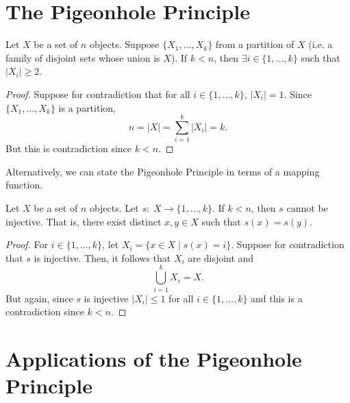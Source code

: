 



\section{The Pigeonhole Principle}

\begin{theorem}
    Let $X$ be a set of $n$ objects. Suppose $\{X_1,\ldots,X_k\}$ from a partition of $X$ (i.e. a family of disjoint sets whose union is $X$). If $k < n$, then $\exists i \in \{1,\ldots,k\}$ such that $|X_i| \geq 2$.
\end{theorem}

\begin{proof}
    Suppose for contradiction that for all $i \in \{1,\ldots,k\}$, $|X_i| = 1$. Since $\{X_1,\ldots,X_k\}$ is a partition, 
    $$
    n = |X| = \sum_{i=1}^k |X_i| = k.
    $$
    But this is contradiction since $k < n$.
\end{proof}

Alternatively, we can state the Pigeonhole Principle in terms of a mapping function.

\begin{theorem}
    Let $X$ be a set of $n$ objects. Let $s:\; X \to \{1,\ldots,k\}$. If $k < n$, then $s$ cannot be injective. That is, there exist distinct $x,y \in X$ such that $s(x) = s(y)$.
\end{theorem}

\begin{proof}
    For $i \in \{1,\ldots,k\}$, let $X_i = \{x \in X \mid s(x) = i\}$. Suppose for contradiction that $s$ is injective. Then, it follows that $X_i$ are disjoint and 
    $$
    \bigcup_{i=1}^k X_i = X.
    $$
    But again, since $s$ is injective $|X_i| \leq 1$ for all $i \in \{1,\ldots,k\}$ and this is a contradiction since $k < n$.
\end{proof}

\section{Applications of the Pigeonhole Principle}


